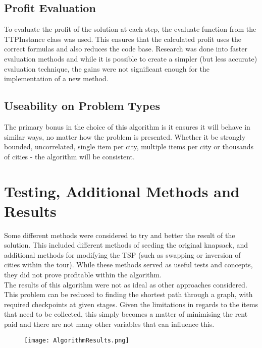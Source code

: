 \documentclass[a4paper, 12pt]{article}
\begin{document}
\newpage

\subsection{Profit Evaluation}
To evaluate the profit of the solution at each step, the evaluate function from the TTPInstance class was used. This ensures that the calculated profit uses the correct formulas and also reduces the code base. Research was done into faster evaluation methods and while it is possible to create a simpler (but less accurate) evaluation technique, the gains were not significant enough for the implementation of a new method.

\subsection{Useability on Problem Types}

The primary bonus in the choice of this algorithm is it ensures it will behave in similar ways, no matter how the problem is presented. Whether it be strongly bounded, uncorrelated, single item per city, multiple items per city or thousands of cities - the algorithm will be consistent. 

\section{Testing, Additional Methods and Results}

Some different methods were considered to try and better the result of the solution. This included different methods of seeding the original knapsack, and additional methods for modifying the TSP (such as swapping or inversion of cities within the tour). While these methods served as useful tests and concepts, they did not prove profitable within the algorithm. \\

The results of this algorithm were not as ideal as other approaches considered. This problem can be reduced to finding the shortest path through a graph, with required checkpoints at given stages. Given the limitations in regards to the items that need to be collected, this simply becomes a matter of minimising the rent paid and there are not many other variables that can influence this. \\

\begin{figure}[h]
\centering
\texttt{[image: AlgorithmResults.png]}
\end{figure}
\end{document}
